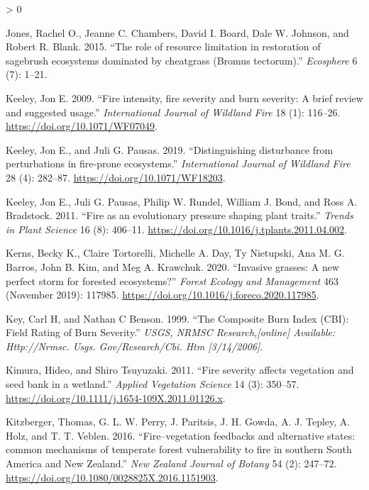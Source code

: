 \documentclass[
  12pt,
]{article}
\newlength{\cslhangindent}
\newenvironment{CSLReferences}[2] %
 {%
  \setlength{\parindent}{0pt}
  \ifodd #1 \everypar{\setlength{\hangindent}{\cslhangindent}}\ignorespaces\fi
  \ifnum #2 > 0
  \setlength{\parskip}{#2\baselineskip}
  \fi
 }%
 {}
\begin{document}
\begin{CSLReferences}{1}{0}
\leavevmode\hypertarget{ref-Jones2015}{}%
Jones, Rachel O., Jeanne C. Chambers, David I. Board, Dale W. Johnson,
and Robert R. Blank. 2015. {``{The role of resource limitation in
restoration of sagebrush ecosystems dominated by cheatgrass (Bromus
tectorum)}.''} \emph{Ecosphere} 6 (7): 1--21.

\leavevmode\hypertarget{ref-Keeley2009}{}%
Keeley, Jon E. 2009. {``{Fire intensity, fire severity and burn
severity: A brief review and suggested usage}.''} \emph{International
Journal of Wildland Fire} 18 (1): 116--26.
\url{https://doi.org/10.1071/WF07049}.

\leavevmode\hypertarget{ref-Keeley2019}{}%
Keeley, Jon E., and Juli G. Pausas. 2019. {``{Distinguishing disturbance
from perturbations in fire-prone ecosystems}.''} \emph{International
Journal of Wildland Fire} 28 (4): 282--87.
\url{https://doi.org/10.1071/WF18203}.

\leavevmode\hypertarget{ref-Keeley2011}{}%
Keeley, Jon E., Juli G. Pausas, Philip W. Rundel, William J. Bond, and
Ross A. Bradstock. 2011. {``{Fire as an evolutionary pressure shaping
plant traits}.''} \emph{Trends in Plant Science} 16 (8): 406--11.
\url{https://doi.org/10.1016/j.tplants.2011.04.002}.

\leavevmode\hypertarget{ref-Kerns2020}{}%
Kerns, Becky K., Claire Tortorelli, Michelle A. Day, Ty Nietupski, Ana
M. G. Barros, John B. Kim, and Meg A. Krawchuk. 2020. {``{Invasive
grasses: A new perfect storm for forested ecosystems?}''} \emph{Forest
Ecology and Management} 463 (November 2019): 117985.
\url{https://doi.org/10.1016/j.foreco.2020.117985}.

\leavevmode\hypertarget{ref-Key1999}{}%
Key, Carl H, and Nathan C Benson. 1999. {``The Composite Burn Index
(CBI): Field Rating of Burn Severity.''} \emph{USGS, NRMSC
Research,{[}online{]} Available: Http://Nrmsc. Usgs. Gov/Research/Cbi.
Htm {[}3/14/2006{]}}.

\leavevmode\hypertarget{ref-Kimura2011}{}%
Kimura, Hideo, and Shiro Tsuyuzaki. 2011. {``{Fire severity affects
vegetation and seed bank in a wetland}.''} \emph{Applied Vegetation
Science} 14 (3): 350--57.
\url{https://doi.org/10.1111/j.1654-109X.2011.01126.x}.

\leavevmode\hypertarget{ref-Kitzberger2016}{}%
Kitzberger, Thomas, G. L. W. Perry, J. Paritsis, J. H. Gowda, A. J.
Tepley, A. Holz, and T. T. Veblen. 2016. {``{Fire--vegetation feedbacks
and alternative states: common mechanisms of temperate forest
vulnerability to fire in southern South America and New Zealand}.''}
\emph{New Zealand Journal of Botany} 54 (2): 247--72.
\url{https://doi.org/10.1080/0028825X.2016.1151903}.


\end{CSLReferences}
\end{document}

